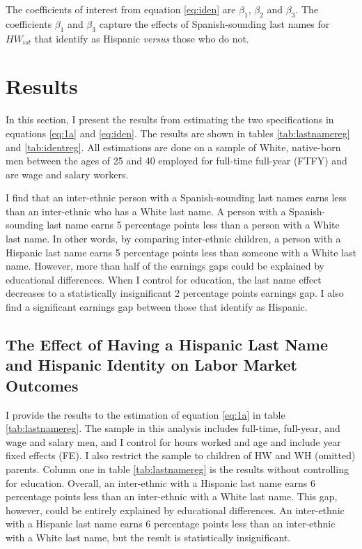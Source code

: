 \documentclass[12pt,english]{article}
\begin{document}
The coefficients of interest from equation \ref{eq:iden} are $\beta_{1}$, $\beta_{2}$ and $\beta_{3}$. The coefficients $\beta_{1}$ and $\beta_{3}$ capture the effects of Spanish-sounding last names for $HW_{ist}$ that identify as Hispanic \textit{versus} those who do not.

\section{Results}\label{sec:results}

In this section, I present the results from estimating the two specifications in equations \ref{eq:1a} and \ref{eq:iden}. The results are shown in tables \ref{tab:lastnamereg} and \ref{tab:identreg}. All estimations are done on a sample of White, native-born men between the ages of 25 and 40 employed for full-time full-year (FTFY) and are wage and salary workers.

I find that an inter-ethnic person with a Spanish-sounding last names earns less than an inter-ethnic who has a White last name. A person with a Spanish-sounding last name earns 5 percentage points less than a person with a White last name. In other words, by comparing inter-ethnic children, a person with a Hispanic last name earns 5 percentage points less than someone with a White last name. However, more than half of the earnings gaps could be explained by educational differences. When I control for education, the last name effect decreases to a statistically insignificant 2 percentage points earnings gap. I also find a significant earnings gap between those that identify as Hispanic. 

\subsection{The Effect of Having a Hispanic Last Name and Hispanic Identity on Labor Market Outcomes}

I provide the results to the estimation of equation \ref{eq:1a} in table \ref{tab:lastnamereg}. The sample in this analysis includes full-time, full-year, and wage and salary men, and I control for hours worked and age and include year fixed effects (FE). I also restrict the sample to children of HW and WH (omitted) parents. Column one in table \ref{tab:lastnamereg} is the results without controlling for education. Overall, an inter-ethnic with a Hispanic last name earns 6 percentage points less than an inter-ethnic with a White last name. This gap, however, could be entirely explained by educational differences. An inter-ethnic with a Hispanic last name earns 6 percentage points less than an inter-ethnic with a White last name, but the result is statistically insignificant.
\end{document}
